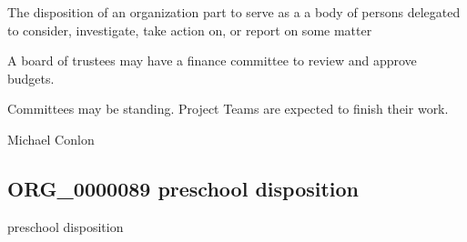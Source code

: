 \documentclass[letterpaper,10pt,english]{sphinxmanual}
\begin{document}
\begin{sphinxShadowBox}

\sphinxAtStartPar
The disposition of an organization part to serve as a a body of persons delegated to consider, investigate, take action on, or report on some matter
\end{sphinxShadowBox}

\begin{sphinxShadowBox}

\sphinxAtStartPar
{}
\end{sphinxShadowBox}

\begin{sphinxShadowBox}

\sphinxAtStartPar
A board of trustees may have a finance committee to review and approve budgets.
\end{sphinxShadowBox}

\begin{sphinxShadowBox}

\sphinxAtStartPar
Committees may be standing.  Project Teams are expected to finish their work.
\end{sphinxShadowBox}

\begin{sphinxShadowBox}

\sphinxAtStartPar
{}
\end{sphinxShadowBox}

\begin{sphinxShadowBox}

\sphinxAtStartPar
Michael Conlon 
\end{sphinxShadowBox}
\begin{quote}

\ignorespaces \end{quote}


\subsection{ORG\_0000089 \sphinxhyphen{} pre\sphinxhyphen{}school disposition}
\label{\detokenize{doc-ORG_0000089:org-0000089-pre-school-disposition}}\label{\detokenize{doc-ORG_0000089:index-0}}\label{\detokenize{doc-ORG_0000089::doc}}
\begin{sphinxShadowBox}

\sphinxAtStartPar
pre\sphinxhyphen{}school disposition
\end{sphinxShadowBox}
\end{document}
